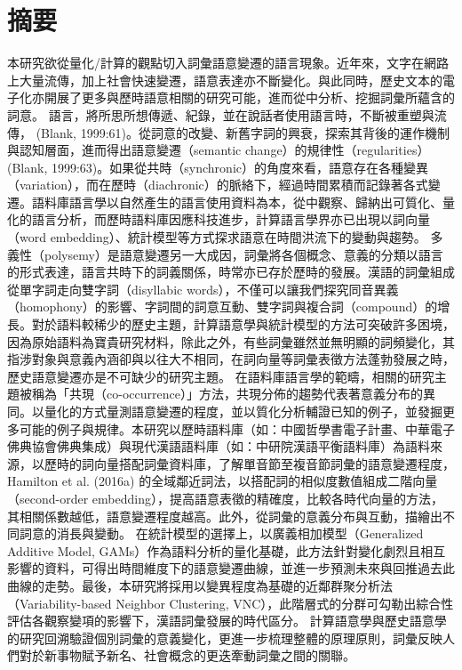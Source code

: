 \chapter*{摘要}
本研究欲從量化/計算的觀點切入詞彙語意變遷的語言現象。近年來，文字在網路上大量流傳，加上社會快速變遷，語意表達亦不斷變化。與此同時，歷史文本的電子化亦開展了更多與歷時語意相關的研究可能，進而從中分析、挖掘詞彙所蘊含的詞意。 語言，將所思所想傳遞、紀錄，並在說話者使用語言時，不斷被重塑與流傳， (Blank, 1999:61)。從詞意的改變、新舊字詞的興衰，探索其背後的運作機制與認知層面，進而得出語意變遷（semantic change）的規律性（regularities）(Blank, 1999:63)。如果從共時（synchronic）的角度來看，語意存在各種變異（variation），而在歷時（diachronic）的脈絡下，經過時間累積而記錄著各式變遷。語料庫語言學以自然產生的語言使用資料為本，從中觀察、歸納出可質化、量化的語言分析，而歷時語料庫因應科技進步，計算語言學界亦已出現以詞向量（word embedding）、統計模型等方式探求語意在時間洪流下的變動與趨勢。 多義性（polysemy）是語意變遷另一大成因，詞彙將各個概念、意義的分類以語言的形式表達，語言共時下的詞義關係，時常亦已存於歷時的發展。漢語的詞彙組成從單字詞走向雙字詞（disyllabic words），不僅可以讓我們探究同音異義（homophony）的影響、字詞間的詞意互動、雙字詞與複合詞（compound）的增長。對於語料較稀少的歷史主題，計算語意學與統計模型的方法可突破許多困境，因為原始語料為寶貴研究材料，除此之外，有些詞彙雖然並無明顯的詞頻變化，其指涉對象與意義內涵卻與以往大不相同，在詞向量等詞彙表徵方法蓬勃發展之時，歷史語意變遷亦是不可缺少的研究主題。 在語料庫語言學的範疇，相關的研究主題被稱為「共現（co-occurrence）」方法，共現分佈的趨勢代表著意義分布的異同。以量化的方式量測語意變遷的程度，並以質化分析輔證已知的例子，並發掘更多可能的例子與規律。本研究以歷時語料庫（如：中國哲學書電子計畫、中華電子佛典協會佛典集成）與現代漢語語料庫（如：中研院漢語平衡語料庫）為語料來源，以歷時的詞向量搭配詞彙資料庫，了解單音節至複音節詞彙的語意變遷程度，Hamilton et al. (2016a) 的全域鄰近詞法，以搭配詞的相似度數值組成二階向量（second-order embedding），提高語意表徵的精確度，比較各時代向量的方法，其相關係數越低，語意變遷程度越高。此外，從詞彙的意義分布與互動，描繪出不同詞意的消長與變動。 在統計模型的選擇上，以廣義相加模型（Generalized Additive Model, GAMs）作為語料分析的量化基礎，此方法針對變化劇烈且相互影響的資料，可得出時間維度下的語意變遷曲線，並進一步預測未來與回推過去此曲線的走勢。最後，本研究將採用以變異程度為基礎的近鄰群聚分析法（Variability-based Neighbor Clustering, VNC），此階層式的分群可勾勒出綜合性評估各觀察變項的影響下，漢語詞彙發展的時代區分。 計算語意學與歷史語意學的研究回溯驗證個別詞彙的意義變化，更進一步梳理整體的原理原則，詞彙反映人們對於新事物賦予新名、社會概念的更迭牽動詞彙之間的關聯。

